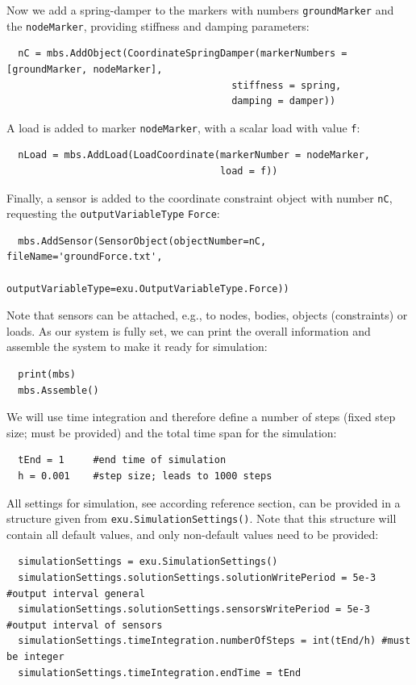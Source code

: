 Now we add a spring-damper to the markers with numbers \texttt{groundMarker} and the \texttt{nodeMarker}, providing stiffness and damping parameters:
\pythonstyle\begin{lstlisting}
  nC = mbs.AddObject(CoordinateSpringDamper(markerNumbers = [groundMarker, nodeMarker], 
                                       stiffness = spring, 
                                       damping = damper)) 
\end{lstlisting}
%
A load is added to marker \texttt{nodeMarker}, with a scalar load with value \texttt{f}:
\pythonstyle\begin{lstlisting}
  nLoad = mbs.AddLoad(LoadCoordinate(markerNumber = nodeMarker, 
                                     load = f))
\end{lstlisting}
%
Finally, a sensor is added to the coordinate constraint object with number \texttt{nC}, requesting the \texttt{outputVariableType} \texttt{Force}:
\pythonstyle\begin{lstlisting}
  mbs.AddSensor(SensorObject(objectNumber=nC, fileName='groundForce.txt', 
                             outputVariableType=exu.OutputVariableType.Force))
\end{lstlisting}
Note that sensors can be attached, e.g., to nodes, bodies, objects (constraints) or loads.
%
As our system is fully set, we can print the overall information and assemble the system to make it ready for simulation:
\pythonstyle\begin{lstlisting}
  print(mbs)
  mbs.Assemble()
\end{lstlisting}
%
We will use time integration and therefore define a number of steps (fixed step size; must be provided) and the total time span for the simulation:
\pythonstyle\begin{lstlisting}
  tEnd = 1     #end time of simulation
  h = 0.001    #step size; leads to 1000 steps
\end{lstlisting}
%
All settings for simulation, see according reference section, can be provided in a structure given from \texttt{exu.SimulationSettings()}. Note that this structure will contain all default values, and only non-default values need to be provided:
\pythonstyle\begin{lstlisting}
  simulationSettings = exu.SimulationSettings()
  simulationSettings.solutionSettings.solutionWritePeriod = 5e-3 #output interval general
  simulationSettings.solutionSettings.sensorsWritePeriod = 5e-3  #output interval of sensors
  simulationSettings.timeIntegration.numberOfSteps = int(tEnd/h) #must be integer
  simulationSettings.timeIntegration.endTime = tEnd
\end{lstlisting}
